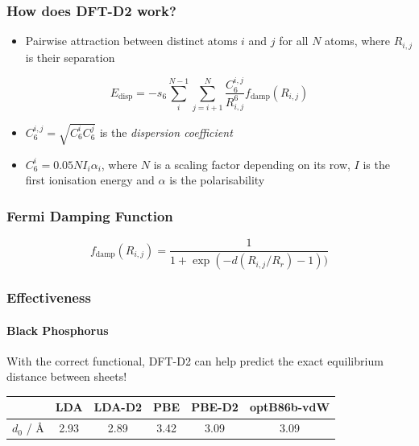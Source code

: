 \documentclass[12pt]{beamer}
\begin{document}
\begin{frame}
  \frametitle{How does DFT-D2 work?}
  \begin{itemize}
    \item Pairwise attraction between distinct atoms $i$ and $j$ for all $N$ atoms, where $R_{i,j}$ is their separation
  \end{itemize}
  $$E_\text{disp} = -s_6 \sum_i^{N-1} \sum_{j=i+1}^{N} \frac{C_6^{i,j}}{R_{i,j}^6}f_\text{damp}(R_{i,j})$$
  \begin{itemize}
    \item $C_6^{i,j} = \sqrt{C_6^iC_6^j}$ is the \emph{dispersion coefficient}
    \item $C_6^i = 0.05NI_i\alpha_i$, where $N$ is a scaling factor depending on its row, $I$ is the first ionisation energy and $\alpha$ is the polarisability
  \end{itemize}
\end{frame}

\begin{frame}
  \frametitle{Fermi Damping Function}
  \begin{center}
    \end{center}
    $$f_\text{damp}(R_{i,j}) = \frac{1}{1 + \exp(-d(R_{i,j}/R_r) - 1))}$$
\end{frame}

\begin{frame}
  \frametitle{Effectiveness}
  \framesubtitle{Black Phosphorus}
  With the correct functional, DFT-D2 can help predict the exact equilibrium distance between sheets!\footnotemark
  \begin{center}
    \begin{tabular}{ c|c|c|c|c|c } 
      &LDA & LDA-D2 & PBE & PBE-D2 & optB86b-vdW \\ 
      \hline
      $d_0$ / \AA & 2.93 & 2.89 & 3.42 & 3.09 & 3.09
    \end{tabular}
    \end{center}
\end{frame}
\end{document}
